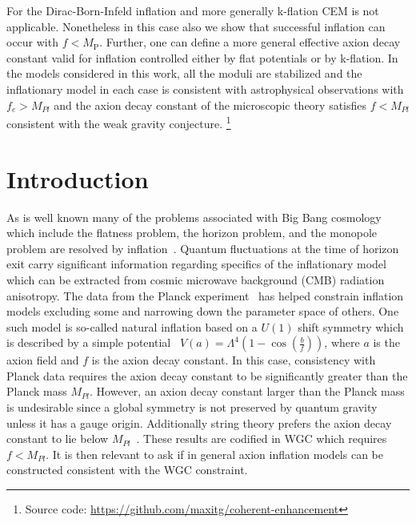 \documentclass[12pt]{article}
\begin{document}
For the Dirac-Born-Infeld inflation
 and more generally k-flation
 CEM is not applicable. 
 Nonetheless in this case also we show that successful inflation can occur with $f < M_\text{P}$. 
Further, one can define a more general effective axion decay constant valid for inflation controlled either by flat potentials or by k-flation.
In the models considered in this work, all the moduli are stabilized and the inflationary model in each case is consistent with astrophysical observations with $f_e > M_{Pl}$ and the axion decay constant of the microscopic theory satisfies $f < M_{Pl}$ consistent with the weak gravity conjecture.
\footnote{Source code: \url{https://github.com/maxitg/coherent-enhancement}}
\newpage

\section{Introduction \label{sec:Introduction}}
As is well known many of the problems associated with Big Bang cosmology which include
the flatness problem, the horizon problem, and the monopole problem are resolved by inflation~\cite{Guth:1980zm, Starobinsky:1980te, Linde:1981mu, Albrecht:1982wi, Sato:1980yn, Linde:1983gd}.
Quantum fluctuations at the time of horizon exit carry significant information regarding specifics of the inflationary model~\cite{Mukhanov:1981xt, Hawking:1982cz, Starobinsky:1982ee, Guth:1982ec, Bardeen:1983qw, Cheung:2007st} which can be extracted from cosmic microwave background (CMB) radiation anisotropy.
The data from the Planck experiment~\cite{Akrami:2018vks, Akrami:2018odb, Array:2015xqh} has helped constrain inflation models excluding some and narrowing down the parameter space of others.
One such model is so-called natural inflation based on a $U(1)$ shift symmetry which is described by a simple potential~\cite{Freese:1990rb, Adams:1992bn} $V\left(a\right) = \Lambda^4 \left(1 - \cos\left(\frac{b}{f}\right)\right)$, where $a$ is the axion field and $f$ is the axion decay constant.
In this case, consistency with Planck data requires the axion decay constant to be significantly greater than the Planck mass $M_{Pl}$.
However, an axion decay constant larger than the Planck mass is undesirable since a global symmetry is not preserved by quantum gravity unless it has a gauge origin.
Additionally string theory prefers the axion decay constant to lie below $M_{Pl}$~\cite{Banks:2003sx, Svrcek:2006yi}.
These results are codified in WGC which requires $f < M_{Pl}$.
It is then relevant to ask if in general axion inflation models can be constructed consistent with the WGC constraint.
\end{document}

